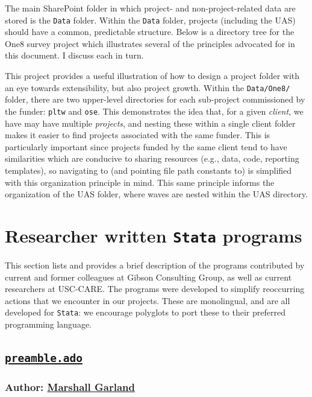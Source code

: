 {The main SharePoint folder in which project- and non-project-related data are stored is the \texttt{Data} folder. Within the \texttt{Data} folder, projects (including the UAS) should have a common, predictable structure. Below is a directory tree for the One8 survey project which illustrates several of the principles advocated for in this document. I discuss each in turn.


This project provides a useful illustration of how to design a project folder with an eye towards extensibility, but also project growth. Within the \texttt{Data/One8/} folder, there are two upper-level directories for each sub-project commissioned by the funder: \texttt{pltw} and \texttt{ose}. This demonstrates the idea that, for a given \textit{client}, we have may have multiple \textit{projects}, and nesting these within a single client folder makes it easier to find projects associated with the same funder. This is particularly important since projects funded by the same client tend to have similarities which are conducive to sharing resources (e.g., data, code, reporting templates), so navigating to (and pointing file path constants to) is simplified with this organization principle in mind. This same principle informs the organization of the UAS folder, where waves are nested within the UAS directory. 

\section{Researcher written \texttt{Stata} programs} \label{sec:ados}
This section lists and provides a brief description of the programs contributed by current and former colleagues at Gibson Consulting Group, as well as current researchers at USC-CARE. The programs were developed to simplify reoccurring actions that we encounter in our projects. These are monolingual, and are all developed for \texttt{Stata}: we encourage polyglots to port these to their preferred programming language.
\subsection{\href{https://github.com/marshallwg/preamble-ado}{\texttt{preamble.ado}}}
\subsubsection{Author: \href{mailto:garlandm@usc.edu}{Marshall Garland}}
}
